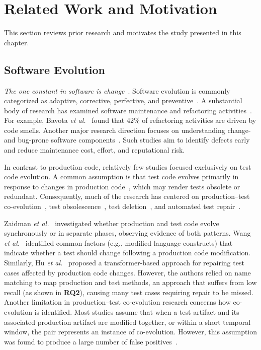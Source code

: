 \section{Related Work and Motivation}
This section reviews prior research and motivates the study presented in this chapter.

\subsection{Software Evolution}

\emph{The one constant in software is change}~\cite{sokolowski2022change}. Software evolution is commonly categorized as adaptive, corrective, perfective, and preventive~\cite{zhang2024developers}. A substantial body of research has examined software maintenance and refactoring activities~\cite{baqais2020automatic,bavota2015experimental,martini2015investigating,vassallo2019large}. For example, Bavota \textit{et al.}~\cite{bavota2015experimental} found that 42\% of refactoring activities are driven by code smells. Another major research direction focuses on understanding change- and bug-prone software components~\cite{arvanitou2017method,chowdhury2022empirical,chowdhury:2022,Shihab:2012,PASCARELLA:2020,chowdhury2024method,Mo:2022}. Such studies aim to identify defects early and reduce maintenance cost, effort, and reputational risk.

In contrast to production code, relatively few studies focused exclusively on test code evolution. A common assumption is that test code evolves primarily in response to changes in production code~\cite{sun_revisiting_2023,hu2023identify}, which may render tests obsolete or redundant. Consequently, much of the research has centered on production--test co-evolution~\cite{zaidman2011studying,sun_revisiting_2023,wang2021understanding}, test obsolescence~\cite{hao2013bug}, test deletion~\cite{bhatta2025understanding}, and automated test repair~\cite{yaraghi2025automated}.

Zaidman \textit{et al.}~\cite{zaidman2011studying} investigated whether production and test code evolve synchronously or in separate phases, observing evidence of both patterns. Wang \textit{et al.}~\cite{wang2021understanding} identified common factors (e.g., modified language constructs) that indicate whether a test should change following a production code modification. Similarly, Hu \textit{et al.}~\cite{hu2023identify} proposed a transformer-based approach for repairing test cases affected by production code changes. However, the authors relied on name matching to map production and test methods, an approach that suffers from low recall (as shown in \textbf{RQ2}), causing many test cases requiring repair to be missed. Another limitation in production--test co-evolution research concerns how co-evolution is identified. Most studies assume that when a test artifact and its associated production artifact are modified together, or within a short temporal window, the pair represents an instance of co-evolution. However, this assumption was found to produce a large number of false positives~\cite{sun_revisiting_2023}.

